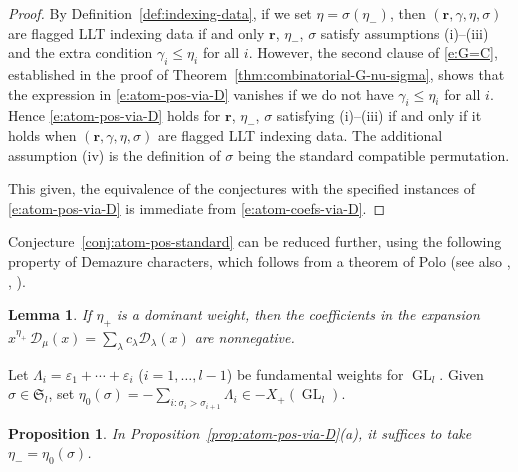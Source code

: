 \documentclass[12pt]{amsart}
\newtheorem{lemma}[thm]{Lemma}
\newtheorem{prop}[thm]{Proposition}
\theoremstyle{definition}
\theoremstyle{remark}
\newcommand{\rr}{{\mathbf r}}
\newcommand{\Sfrak}{{\mathfrak S}}
\newcommand{\Dcal}{{\mathcal D}}
\DeclareMathOperator{\GL}{GL}
\begin{document}
\begin{proof}
By Definition~\ref{def:indexing-data}, if we set $\eta = \sigma (\eta
_{-})$, then $(\rr ,\gamma ,\eta ,\sigma )$ are flagged LLT indexing
data if and only $\rr$, $\eta _{-}$, $\sigma $ satisfy assumptions (i)--(iii)
and the extra condition $\gamma _{i}\leq \eta _{i}$ for all $i$.
However, the second clause of \eqref{e:G=C}, established in the proof
of Theorem~\ref{thm:combinatorial-G-nu-sigma}, shows that the
expression in \eqref{e:atom-pos-via-D} vanishes if we do not have
$\gamma _{i}\leq \eta _{i}$ for all $i$.  Hence
\eqref{e:atom-pos-via-D} holds for $\rr $, $\eta _{-}$, $\sigma $
satisfying (i)--(iii) if and only if it holds when $(\rr ,\gamma ,\eta
,\sigma )$ are flagged LLT indexing data.  The additional assumption
(iv) is the definition of $\sigma $ being the standard compatible
permutation.

This given, the equivalence of the conjectures with the specified
instances of \eqref{e:atom-pos-via-D} is immediate from
\eqref{e:atom-coefs-via-D}.
\end{proof}

Conjecture~\ref{conj:atom-pos-standard} can be reduced further, using
the following property of Demazure characters, which follows from a
theorem of Polo \cite{Polo} (see also \cite{Mathieu},
\cite[\S2]{MathieuPositivity}, \cite[Ch. 6]{vanderKallenBModule}).

\begin{lemma}\label{lem:dom-times-Dem}
If $\eta _{+}$ is a dominant weight, then the coefficients in the
expansion $x^{\eta _{+}}\, \Dcal_{\mu }(x) = \sum _{\lambda
}c_{\lambda } \Dcal _{\lambda }(x)$ are nonnegative.
\end{lemma}


Let $\Lambda _{i} = \varepsilon _{1}+\cdots +\varepsilon _{i}$
($i=1,\ldots,l-1$) be fundamental weights for $\GL _{l}$.  Given
$\sigma \in \Sfrak _{l}$, set $\eta _{0}(\sigma ) = - \sum _{i\colon
\sigma _{i}>\sigma _{i+1}} \Lambda _{i}\in -X_{+}(\GL _{l})$.

\begin{prop}\label{prop:atom-pos-via-D-reduced}
In Proposition~\ref{prop:atom-pos-via-D}(a), it suffices to take $\eta
_{-} = \eta _{0}(\sigma )$.
\end{prop}
\end{document}

